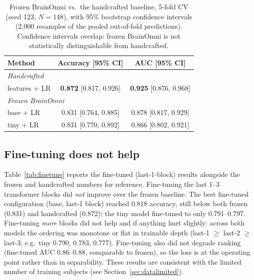 \documentclass[11pt]{article}
\begin{document}
\begin{table}[h]
\centering
\begin{tabular}{|l|c|c|}
\hline
Method & Accuracy [95\% CI] & AUC [95\% CI] \\
\hline
\multicolumn{3}{|l|}{\textit{Handcrafted}} \\
\hline
\quad 6 features + LR              & \textbf{0.872} [0.817, 0.926] & \textbf{0.925} [0.876, 0.968] \\
\hline
\multicolumn{3}{|l|}{\textit{Frozen BrainOmni}} \\
\hline
\quad base + LR                    & 0.831 [0.764, 0.885] & 0.878 [0.817, 0.929] \\
\hline
\quad tiny + LR                    & 0.831 [0.770, 0.892] & 0.866 [0.802, 0.921] \\
\hline
\end{tabular}
\caption{Frozen BrainOmni vs.\ the handcrafted baseline, 5-fold CV (seed 123, $N=148$), with
95\% bootstrap confidence intervals (2{,}000 resamples of the pooled out-of-fold predictions).
Confidence intervals overlap: frozen BrainOmni is not statistically distinguishable from
handcrafted.}
\label{tab:frozen}
\end{table}

\subsection{Fine-tuning does not help}
Table~\ref{tab:finetune} reports the fine-tuned (last-1-block) results alongside the frozen and
handcrafted numbers for reference. Fine-tuning the last 1--3 transformer blocks did \emph{not}
improve over the frozen baseline. The best fine-tuned configuration (base, last-1 block) reached
0.818 accuracy, still below both frozen (0.831) and handcrafted (0.872); the tiny model fine-tuned
to only 0.791--0.797. Fine-tuning \emph{more} blocks did not help and if anything hurt slightly:
across both models the ordering was monotone or flat in trainable depth (last-1 $\geq$ last-2
$\geq$ last-3; e.g.\ tiny 0.790, 0.783, 0.777). Fine-tuning also did not degrade ranking (fine-tuned
AUC 0.86--0.88, comparable to frozen), so the loss is at the operating point rather than in
separability. These results are consistent with the limited number of training subjects (see
Section~\ref{sec:datalimited}).
\end{document}
